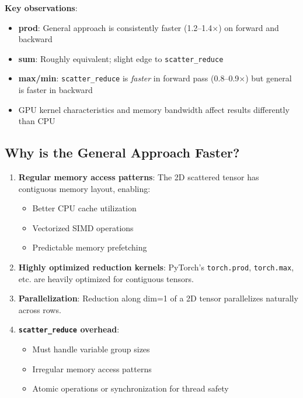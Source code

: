 \documentclass[11pt]{article}
\begin{document}
\textbf{Key observations}:
\begin{itemize}
    \item \textbf{prod}: General approach is consistently faster (1.2--1.4$\times$) on forward and backward
    \item \textbf{sum}: Roughly equivalent; slight edge to \texttt{scatter\_reduce}
    \item \textbf{max/min}: \texttt{scatter\_reduce} is \textit{faster} in forward pass (0.8--0.9$\times$) but general is faster in backward
    \item GPU kernel characteristics and memory bandwidth affect results differently than CPU
\end{itemize}

\subsection{Why is the General Approach Faster?}

\begin{enumerate}
    \item \textbf{Regular memory access patterns}: The 2D scattered tensor has contiguous memory layout, enabling:
    \begin{itemize}
        \item Better CPU cache utilization
        \item Vectorized SIMD operations
        \item Predictable memory prefetching
    \end{itemize}
    
    \item \textbf{Highly optimized reduction kernels}: PyTorch's \texttt{torch.prod}, \texttt{torch.max}, etc. are heavily optimized for contiguous tensors.
    
    \item \textbf{Parallelization}: Reduction along dim=1 of a 2D tensor parallelizes naturally across rows.
    
    \item \textbf{\texttt{scatter\_reduce} overhead}:
    \begin{itemize}
        \item Must handle variable group sizes
        \item Irregular memory access patterns
        \item Atomic operations or synchronization for thread safety
    \end{itemize}
\end{enumerate}
\end{document}
